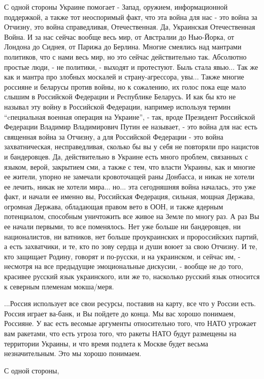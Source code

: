 С одной стороны Украине помогает - Запад, оружием, информационной поддержкой, а
также тот неоспоримый факт, что эта война для нас - это война за Отчизну, это
война справедливая, Отечественная. Да, Украинская Отечественная Война. И за нас
сейчас вообще весь мир, от Австралии до Нью-Йорка, от Лондона до Сиднея, от
Парижа до Берлина. Многие смеялись над мантрами политиков, что с нами весь мир,
но это сейчас действительно так. Абсолютно простые люди, - не политики, -
выходят и протестуют.  Быль стала явью... Так же как и мантра про злобных
москалей и страну-агрессора, увы...  Также многие россияне и беларусы против
войны, но к сожалению, их голос пока еще мало слышим в Российской Федерации и
Республике Беларусь. И как бы кто не называл эту войну в Российской Федерации,
например используя термин \enquote{cпециальная военная операция на Украине}, -
так, вроде Президент Российской Федерации Владимир Владимирович Путин ее
называет, - это война для нас есть священная война за Отчизну, а для Российской
Федерации - это война захватническая, несправедливая, сколько бы вы у себя не
повторяли про нацистов и бандеровцев. Да, действительно в Украине есть много
проблем, связанных с языком, верой, закрытием сми, а также с тем, что власти
Украины, как и многие ее жители, упорно не замечали кровоточащей раны Донбасса,
и никак не хотели ее лечить, никак не хотели мира... но... эта сегодняшняя
война началась, это уже факт, и начали ее именно вы, Российская Федерация,
сильная, мощная Держава, огромная Держава, обладающая правом вето в ООН, и
также ядерным потенциалом, способным уничтожить все живое на Земле по многу
раз. А раз Вы ее начали первыми, то все поменялось.  Нет уже больше ни
бандеровцев, ни националистов, ни ватников, нет больше проукраинских и
пророссийских партий, а есть захватчики, и те, кто по зову сердца и души воюет
за свою Отчизну. И те, кто защищает Родину, говорят и по-русски, и на
украинском, и сейчас им, - несмотря на все предыдущие эмоциональные дискусии, -
вообще не до того, красивее русский язык украинского, или же то, насколько
русский язык относится к северным племенам мокша/меря.

...Россия использует все свои ресурсы, поставив на карту, все что у России
есть. Россия играет ва-банк, и Вы пойдете до конца. Мы вас хорошо понимаем,
Россияне. У вас есть весомые аргументы относительно того, что НАТО угрожает вам
ракетами, что есть угроза того, что ракеты НАТО будут размещены на территории
Украины, и что время подлета к Москве будет весьма незначительным. Это мы
хорошо понимаем. 

С одной стороны,
